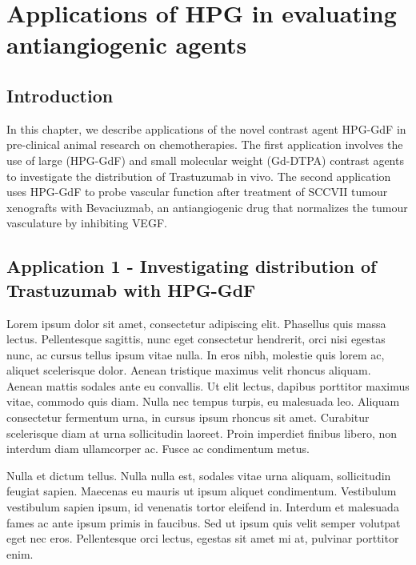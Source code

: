 

\chapter{Applications of HPG in evaluating antiangiogenic agents}
\label{ch:HPG2}

\section{Introduction}

In this chapter, we describe applications of the novel contrast agent HPG-GdF in pre-clinical animal research on chemotherapies.
The first application involves the use of large (\ac{HPG-GdF}) and small molecular weight (\ac{Gd-DTPA}) contrast agents to investigate the distribution of Trastuzumab in vivo. 
The second application uses HPG-GdF to probe vascular function after treatment of SCCVII tumour xenografts with Bevaciuzmab, an antiangiogenic drug that normalizes the tumour vasculature by inhibiting \ac{VEGF}.

\section{Application 1 - Investigating distribution of Trastuzumab with HPG-GdF}

Lorem ipsum dolor sit amet, consectetur adipiscing elit. Phasellus quis massa lectus. Pellentesque sagittis, nunc eget consectetur hendrerit, orci nisi egestas nunc, ac cursus tellus ipsum vitae nulla. In eros nibh, molestie quis lorem ac, aliquet scelerisque dolor. Aenean tristique maximus velit rhoncus aliquam. Aenean mattis sodales ante eu convallis. Ut elit lectus, dapibus porttitor maximus vitae, commodo quis diam. Nulla nec tempus turpis, eu malesuada leo. Aliquam consectetur fermentum urna, in cursus ipsum rhoncus sit amet. Curabitur scelerisque diam at urna sollicitudin laoreet. Proin imperdiet finibus libero, non interdum diam ullamcorper ac. Fusce ac condimentum metus.

Nulla et dictum tellus. Nulla nulla est, sodales vitae urna aliquam, sollicitudin feugiat sapien. Maecenas eu mauris ut ipsum aliquet condimentum. Vestibulum vestibulum sapien ipsum, id venenatis tortor eleifend in. Interdum et malesuada fames ac ante ipsum primis in faucibus. Sed ut ipsum quis velit semper volutpat eget nec eros. Pellentesque orci lectus, egestas sit amet mi at, pulvinar porttitor enim.

